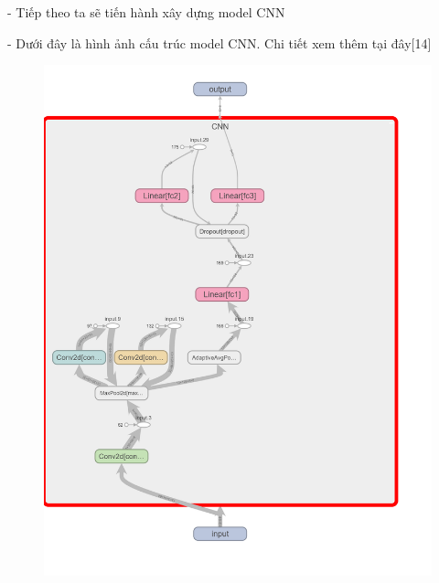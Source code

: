 \documentclass[12pt, a4paper]{article}
\begin{document}
\newpage
\par - Tiếp theo ta sẽ tiến hành xây dựng model CNN
\par - Dưới đây là hình ảnh cấu trúc model CNN. Chi tiết xem thêm tại đây[14]

\begin{figure}[h] %
    \centering
    \includegraphics[scale = 0.2]{Img/Money/P1.png}
\end{figure}
\end{document}

